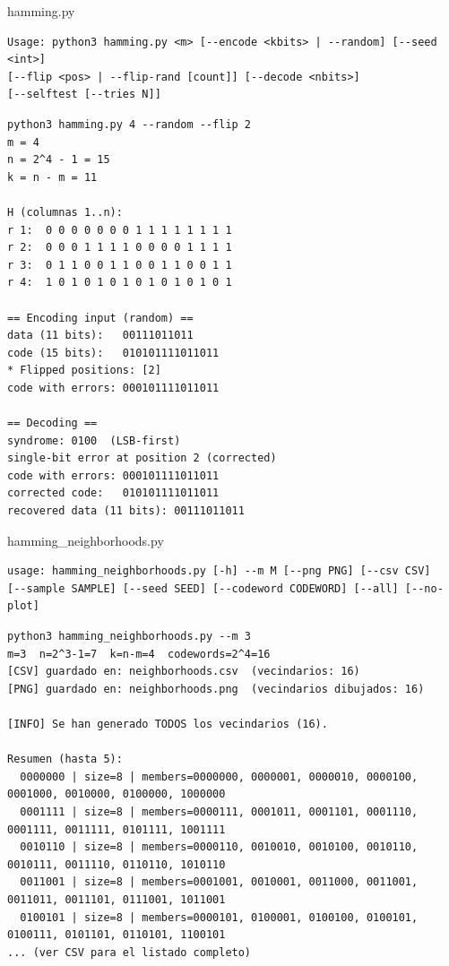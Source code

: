 \documentclass{beamer}
\theoremstyle{plain}
\theoremstyle{example}
\theoremstyle{example}
\begin{document}
\begin{frame}[fragile]  {hamming.py}\footnotesize  

\begin{verbatim}  
Usage: python3 hamming.py <m> [--encode <kbits> | --random] [--seed <int>]
[--flip <pos> | --flip-rand [count]] [--decode <nbits>] 
[--selftest [--tries N]]
\end{verbatim}
\tiny
\begin{verbatim}  
python3 hamming.py 4 --random --flip 2
m = 4
n = 2^4 - 1 = 15
k = n - m = 11

H (columnas 1..n):
r 1:  0 0 0 0 0 0 0 1 1 1 1 1 1 1 1
r 2:  0 0 0 1 1 1 1 0 0 0 0 1 1 1 1
r 3:  0 1 1 0 0 1 1 0 0 1 1 0 0 1 1
r 4:  1 0 1 0 1 0 1 0 1 0 1 0 1 0 1

== Encoding input (random) ==
data (11 bits):   00111011011
code (15 bits):   010101111011011
* Flipped positions: [2]
code with errors: 000101111011011

== Decoding ==
syndrome: 0100  (LSB-first)
single-bit error at position 2 (corrected)
code with errors: 000101111011011
corrected code:   010101111011011
recovered data (11 bits): 00111011011
\end{verbatim}

\end{frame} 


\begin{frame}[fragile]  {hamming\_neighborhoods.py}\footnotesize  

\begin{verbatim}  
usage: hamming_neighborhoods.py [-h] --m M [--png PNG] [--csv CSV] 
[--sample SAMPLE] [--seed SEED] [--codeword CODEWORD] [--all] [--no-plot]
\end{verbatim}
\tiny
\begin{verbatim}  
python3 hamming_neighborhoods.py --m 3
m=3  n=2^3-1=7  k=n-m=4  codewords=2^4=16
[CSV] guardado en: neighborhoods.csv  (vecindarios: 16)
[PNG] guardado en: neighborhoods.png  (vecindarios dibujados: 16)

[INFO] Se han generado TODOS los vecindarios (16).

Resumen (hasta 5):
  0000000 | size=8 | members=0000000, 0000001, 0000010, 0000100, 0001000, 0010000, 0100000, 1000000
  0001111 | size=8 | members=0000111, 0001011, 0001101, 0001110, 0001111, 0011111, 0101111, 1001111
  0010110 | size=8 | members=0000110, 0010010, 0010100, 0010110, 0010111, 0011110, 0110110, 1010110
  0011001 | size=8 | members=0001001, 0010001, 0011000, 0011001, 0011011, 0011101, 0111001, 1011001
  0100101 | size=8 | members=0000101, 0100001, 0100100, 0100101, 0100111, 0101101, 0110101, 1100101
... (ver CSV para el listado completo)
\end{verbatim}

\end{frame} 
\end{document}
